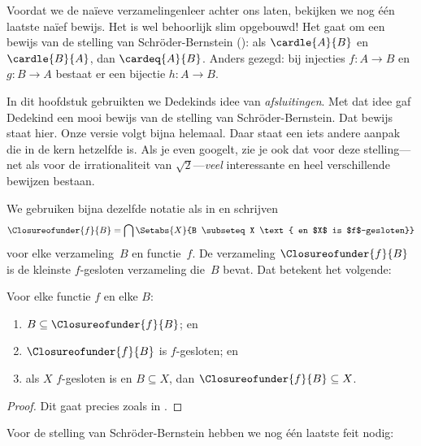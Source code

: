 \documentclass[../../../include/open-logic-section]{subfiles}
\begin{document}


Voordat we de na\"ieve verzamelingenleer achter ons laten, bekijken we
nog één laatste na\"ief bewijs. Het is wel behoorlijk slim opgebouwd!
Het gaat om een bewijs van de stelling van Schr\"oder-Bernstein
(): als
$\cardle{A}{B}$ en $\cardle{B}{A}$, dan $\cardeq{A}{B}$. Anders
gezegd: bij injecties $f \colon A \to B$ en $g \colon B \to A$
bestaat er een bijectie $h \colon A \to B$.

In dit hoofdstuk gebruikten we Dedekinds idee van \emph{afsluitingen}.
Met dat idee gaf Dedekind een mooi bewijs van de stelling van
Schr\"oder-Bernstein. Dat bewijs staat hier. Onze versie volgt
\citet[pp.~157--8]{Potter2004} bijna helemaal. Daar staat een iets
andere aanpak die in de kern hetzelfde is. Als je even googelt, zie je
ook dat voor deze stelling---net als voor de irrationaliteit van
$\sqrt{2}$---\emph{veel} interessante en heel verschillende bewijzen
bestaan.

We gebruiken bijna dezelfde notatie als in
 en schrijven
\[
\Closureofunder{f}{B} = \bigcap \Setabs{X}{B \subseteq X
\text{ en $X$ is $f$-gesloten}}
\]
voor elke verzameling~$B$ en functie~$f$. De verzameling
$\Closureofunder{f}{B}$ is de kleinste $f$-gesloten verzameling die~$B$
bevat. Dat betekent het volgende:

\begin{lem}
	Voor elke functie $f$ en elke $B$:
	\begin{enumerate}
		\item{} $B \subseteq \Closureofunder{f}{B}$; en
		\item{} $\Closureofunder{f}{B}$ is $f$-gesloten; en
		\item{} als $X$ $f$-gesloten is en $B
		\subseteq X$, dan $\Closureofunder{f}{B} \subseteq X$.
	\end{enumerate}
\end{lem}

\begin{proof}
Dit gaat precies zoals in
.
\end{proof}

Voor de stelling van Schr\"oder-Bernstein hebben we nog één laatste feit
nodig:
\end{document}
